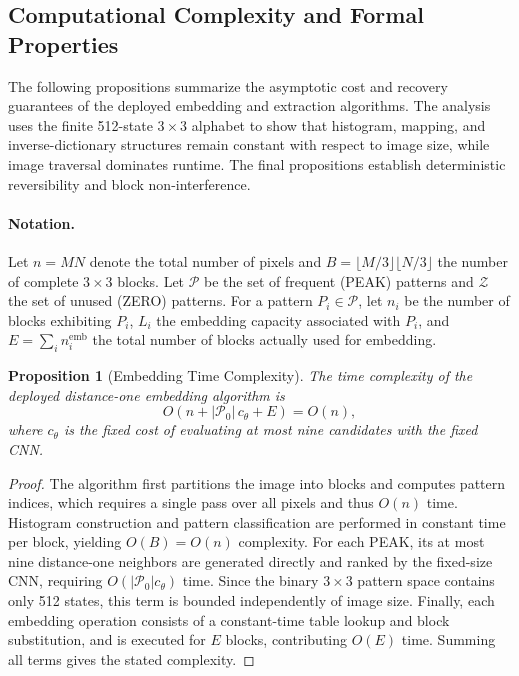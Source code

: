 \documentclass[a4paper,fleqn]{cas-dc}
\newtheorem{proposition}{Proposition}[section]
\newcommand{\RevisionAddBegin}{\begingroup\color{revisionblue}}
\newcommand{\RevisionAddEnd}{\endgroup}
\begin{document}
\subsection{Computational Complexity and Formal Properties}
\label{subsec:complexity-analysis}

\RevisionAddBegin
The following propositions summarize the asymptotic cost and recovery
guarantees of the deployed embedding and extraction algorithms. The analysis
uses the finite 512-state $3\times3$ alphabet to show that histogram, mapping,
and inverse-dictionary structures remain constant with respect to image size,
while image traversal dominates runtime. The final propositions establish
deterministic reversibility and block non-interference.
\RevisionAddEnd

\paragraph{Notation.}
Let $n=MN$ denote the total number of pixels and
$B=\lfloor M/3\rfloor\lfloor N/3\rfloor$ the number of complete
$3\times3$ blocks.
Let $\mathcal{P}$ be the set of frequent (PEAK) patterns and
$\mathcal{Z}$ the set of unused (ZERO) patterns.
For a pattern $P_i \in \mathcal{P}$, let $n_i$ be the number of blocks
exhibiting $P_i$, $L_i$ the embedding capacity associated with $P_i$, and
$E = \sum_i n_i^{\text{emb}}$ the total number of blocks actually used for
embedding.

\begin{proposition}[Embedding Time Complexity]
The time complexity of the deployed distance-one embedding algorithm is
\begin{equation}
O\!\left(n+|\mathcal P_0|\,c_\theta+E\right)=O(n),
\label{eq:embedding-complexity}
\end{equation}
where $c_\theta$ is the fixed cost of evaluating at most nine candidates with
the fixed CNN.
\end{proposition}

\begin{proof}
The algorithm first partitions the image into blocks and computes pattern
indices, which requires a single pass over all pixels and thus $O(n)$ time.
Histogram construction and pattern classification are performed in constant
time per block, yielding $O(B)=O(n)$ complexity.
For each PEAK, its at most nine distance-one neighbors are generated directly
and ranked by the fixed-size CNN, requiring
$O(|\mathcal P_0|c_\theta)$ time. Since the binary $3\times3$ pattern space
contains only 512 states, this term is bounded independently of image size.
Finally, each embedding operation consists of a constant-time table lookup and
block substitution, and is executed for $E$ blocks, contributing $O(E)$ time.
Summing all terms gives the stated complexity.
\end{proof}
\end{document}
